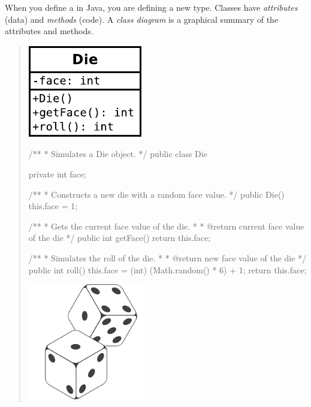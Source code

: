 
When you define a  in Java, you are defining a new type.
Classes have \emph{attributes} (data) and \emph{methods} (code).
A \emph{class diagram} is a graphical summary of the attributes and methods.

\vspace{1em}
\begin{quote}
\hfill\includegraphics{Die.pdf}
\vspace*{-84pt}

\begin{javalst}
/**
 * Simulates a Die object.
 */
public class Die {
    
    private int face;
    
    /**
     * Constructs a new die with a random face value.
     */
    public Die() {
        this.face = 1;
    }
    
    /**
     * Gets the current face value of the die.
     *
     * @return current face value of the die
     */
    public int getFace() {
        return this.face;
    }
    
    /**
     * Simulates the roll of the die.
     *
     * @return new face value of the die
     */
    public int roll() {
        this.face = (int) (Math.random() * 6) + 1;
        return this.face;
    }
    
}
\end{javalst}

\vspace*{-128pt}
\hfill\includegraphics[width=2in]{dice.png}
\end{quote}


